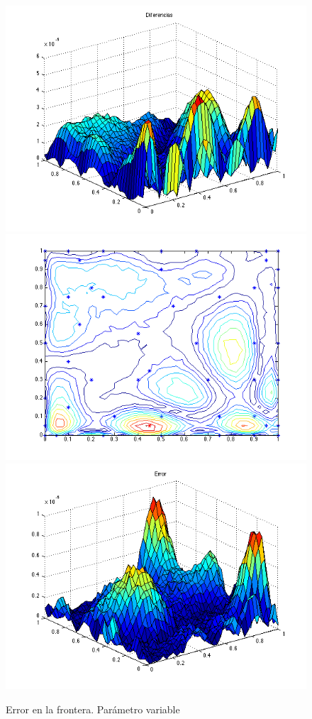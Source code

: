 \documentclass[11pt,a4paper]{article}
\begin{document}
\begin{figure}

\includegraphics[scale=.27]{diferencias4.png}
\includegraphics[scale=.27]{centros4.png}
\includegraphics[scale=.27]{error4.png}
\caption{Error en la frontera. Parámetro variable}
\end{figure}
\end{document}
